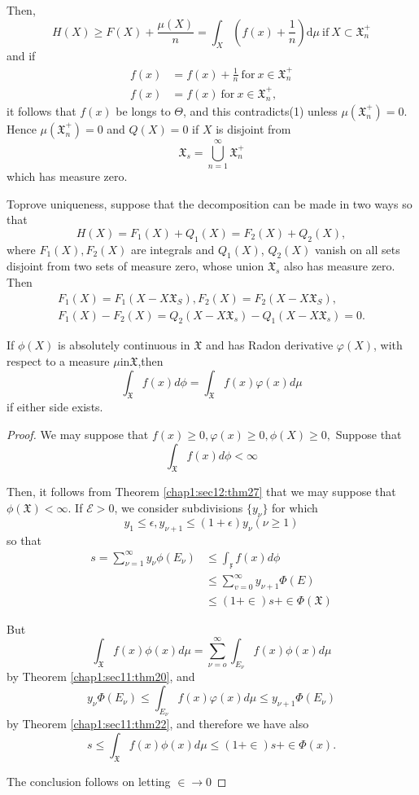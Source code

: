Then,
$$ 
H(X)\geq F(X)+ \frac{\mu(X)}{n}=\int_X (f(x)+\frac{1}{n})\text {d}\mu
~\text{if}~ X \subset\mathfrak{X}^+_n
$$
and if
\begin{align*}
f(x) & =f(x)+\frac{1}{n} ~\text{for}~ x \in\mathfrak{X}^+_n\\
f(x) & =f(x) ~\text{for}~ x \in \mathfrak{X}^+_n,
\end{align*}
it follows that $ f(x)$ be longs to $\Theta$, and this contradicts(1) unless
$\mu(\mathfrak{X}^+_n)=0$. Hence $\mu(\mathfrak{X}^+_n)=0$ and
$Q(X)=0$ if $X$ is disjoint from 
$$
\mathfrak{X}_s=\bigcup^{\infty}_{n=1}\mathfrak{X}^+_n
$$
which has measure zero.

To\pageoriginale prove uniqueness, suppose that the decomposition can be
made in two ways so that 
$$ 
H(X)=F_1(X)+Q_1(X)=F_2(X)+Q_2(X),
$$
where $F_1(X),F_2(X)$ are integrals and $ Q_1(X)$, $Q_2(X)$ vanish on all sets 
disjoint from two sets of measure zero, whose union $\mathfrak{X}_s$ also has 
measure zero. Then
\begin{multline*}
  F_1(X)=F_1(X-X \mathfrak{X}_S),F_2(X)=F_2(X-X\mathfrak{X}_S),\\
  F_1(X)-F_2(X)=Q_2(X-X\mathfrak{X}_s)-Q_1(X-X\mathfrak{X}_s)=0.
\end{multline*}

\begin{theorem}\label{chap1:sec16:thm45}
  If $\phi(X)$ is absolutely continuous in $\mathfrak{X}$ and 
  has Radon derivative $\varphi(X)$, with respect to a measure
  $\mu$in$\mathfrak{X}$,then 
  $$
  \int_{\mathfrak{X}}f(x)d \phi=\int_{\mathfrak{X}} f(x) \varphi (x)
  d\mu
  $$
  if either side exists.
\end{theorem}
\begin{proof}
  We may suppose that $f(x)\geq 0,\varphi(x)\geq 0, \phi(X)\geq 0,$
  Suppose that
  $$
  \int_{\mathfrak{X}}f(x)d \phi < \infty
  $$
  
  Then, it follows from Theorem \ref{chap1:sec12:thm27} that we may suppose that $
  \phi(\mathfrak{X})<\infty$.
  If $\mathcal{E}>0$, we consider subdivisions $\{y_\nu\}$ for which
  $$
  y_1\leq  \epsilon, y_{\nu+1}\leq (1+\epsilon)y_{\nu} (\nu\geq 1)
  $$
  so that
  \begin{align*}
    s=\sum^{\infty}_{\nu=1} y_{\nu}\phi\left(E_\nu\right)&\leq 
    \int_{\mathfrak{x}} f(x)d \phi\\
    &\leq \sum_{v=0}^{\infty} y_{\nu +1} \Phi(E)\\ 
    &\leq(1+ \in)s + \in \Phi(\mathfrak{X})
  \end{align*}

  But\pageoriginale 
  $$ 
  \int_{\mathfrak{X}} f(x) \phi (x)d\mu = \sum^{\infty}_{\nu=o}
  \int_{E_{\nu}} f (x) \phi(x)d \mu 
  $$ 
  by Theorem \ref{chap1:sec11:thm20}, and  
  $$ 
  y_\nu \Phi (E_\nu) \leq \int_{E_\nu} f(x) \varphi (x)d\mu \leq
  y_{\nu+1} \Phi (E_\nu ) 
  $$
  by Theorem \ref{chap1:sec11:thm22}, and therefore we have also  
  $$ 
  s \leq \int_{\mathfrak{X}} f(x) \phi (x) d \mu \leq  (1+\in) s+\in
  \Phi (x). 
  $$

  The conclusion follows on letting $\in \rightarrow 0 $ 
\end{proof}

